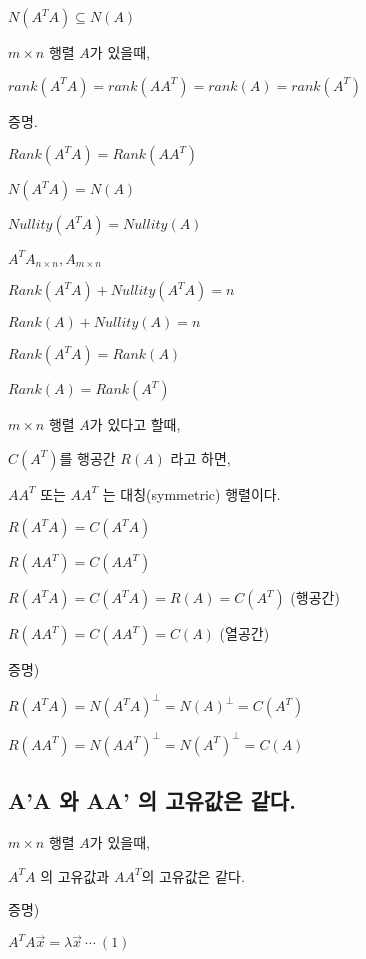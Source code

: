 $N(A^TA) \subseteq N(A)$



\begin{theorem}
$m \times n$ 행렬 $A$가 있을때,

$rank(A^TA) = rank(AA^T) = rank(A) = rank(A^T)$
\end{theorem}

증명.

$Rank(A^TA) = Rank(AA^T)$

$N(A^TA) = N(A)$

$Nullity(A^TA) = Nullity(A)$

$A^TA_{n \times n}, A_{m \times n}$

$Rank(A^TA) + Nullity(A^TA) = n$

$Rank(A) + Nullity(A) = n$

$Rank(A^TA) = Rank(A)$

$Rank(A) = Rank(A^T)$





\begin{theorem}
$m \times n$ 행렬 $A$가 있다고 할때,

$C(A^T)$를 행공간 $R(A)$ 라고 하면,

$AA^T$ 또는 $AA^T$ 는 대칭(symmetric) 행렬이다.

$R(A^TA) = C(A^TA)$

$R(AA^T) = C(AA^T) $

$R(A^TA) = C(A^TA) = R(A) = C(A^T)$  (행공간)

$R(AA^T) = C(AA^T) = C(A) $  (열공간)
\end{theorem}



증명)

$R(A^TA) = N(A^TA)^{\perp} = N(A)^{\perp} = C(A^T)$

$R(AA^T) = N(AA^T)^{\perp} = N(A^T)^{\perp} = C(A)$


\newpage
\subsection{A'A 와 AA' 의 고유값은 같다.}

\begin{theorem}
$m \times n$ 행렬 $A$가 있을때,

$A^TA$ 의 고유값과 $AA^T$의 고유값은 같다.
\end{theorem}

증명)

$A^TA\vec{x} = \lambda\vec{x} \ \cdots \ (1)$

